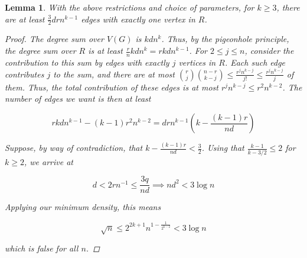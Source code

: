 \documentclass[12pt]{article}
\newtheorem{lemma}[thm]{Lemma}
\theoremstyle{remark}
\begin{document}
    \begin{lemma}
        With the above restrictions and choice of parameters, \color{red} for $k \geq 3$, \color{black}
        there are at least $\frac{3}{2}drn^{k-1}$
        edges with exactly one vertex in $R$.

        \begin{proof}

            The degree sum over $V(G)$ is $kdn^{k}$.
            Thus, by the pigeonhole principle, the degree sum over $R$ is at least
            $\frac{r}{n}kdn^{k} = rkdn^{k-1}$.
            For $2 \leq j \leq n$, consider the contribution to this sum by edges with exactly $j$ vertices in $R$.
            Each such edge contributes $j$ to the sum, and there are at most
            $\binom{r}{j}\binom{n-r}{k-j} \leq \frac{r^j n^{k-j}}{j!} \leq \frac{r^j n^{k-j}}{j}$ of them.
            Thus, the total contribution of these edges is at most $r^j n^{k-j} \leq r^{2}n^{k-2}$.
            The number of edges we want is then at least

            \[
                rkdn^{k-1} - (k-1)r^{2}n^{k-2} = drn^{k-1} \left( k - \frac{(k-1)r}{nd}\right)
            \]
            
            Suppose, by way of contradiction,
            that $ k - \frac{(k-1)r}{nd} < \frac{3}{2}$.
            Using that $\frac{k-1}{k-3/2} \leq 2$
            for $k \geq 2$, we arrive at

            \[
                d < 2rn^{-1} \leq \frac{3q}{nd} \implies nd^2 < 3 \log n
            \]
            
            Applying our minimum density, this means
            
            \[
                \sqrt {n} \leq 2^{2k+1} n^{1 - \frac{1}{2^{k-2}}} < 3 \log n
            \]

            which is false for all $n$.
        \end{proof}
    \end{lemma}
\end{document}
